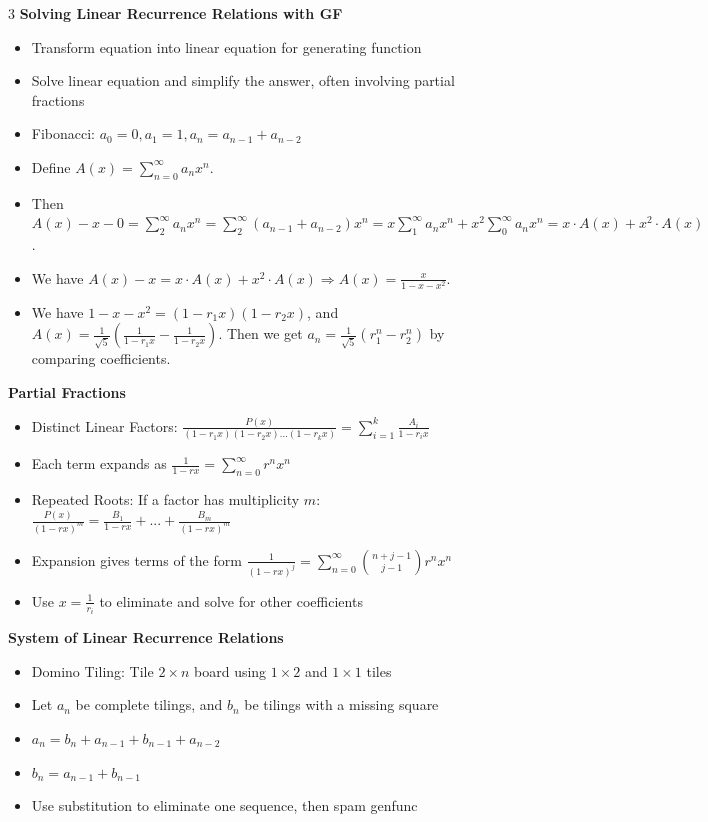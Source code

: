 \documentclass[10pt, landscape]{article}
\begin{document}
\begin{multicols*}{3}
\textbf{Solving Linear Recurrence Relations with GF}
\begin{itemize}
    \item Transform equation into linear equation for generating function
    \item Solve linear equation and simplify the answer, often involving partial fractions
    \item Fibonacci: $a_0=0, a_1=1,a_n=a_{n-1}+a_{n-2}$
    \item Define $A(x)=\sum_{n=0}^\infty a_nx^n$.
    \item Then $A(x)-x-0=\sum_{2}^\infty a_nx^n=\sum_{2}^\infty(a_{n-1}+a_{n-2})x^n=x\sum_{1}^\infty a_nx^n+x^2\sum_{0}^\infty a_nx^n=x\cdot A(x) + x^2 \cdot A(x)$.
    \item We have $A(x)-x=x\cdot A(x)+x^2 \cdot A(x) \Rightarrow A(x)=\frac{x}{1-x-x^2}$.
    \item We have $1-x-x^2=(1-r_1x)(1-r_2x)$, and $A(x)=\frac{1}{\sqrt{5}}(\frac{1}{1-r_1x}-\frac{1}{1-r_2x})$. Then we get $a_n=\frac{1}{\sqrt{5}}(r_1^n-r_2^n)$ by comparing coefficients.
\end{itemize}

\textbf{Partial Fractions}
\begin{itemize}
    \item Distinct Linear Factors: $\frac{P(x)}{(1-r_1x)(1-r_2x)...(1-r_kx)}=\sum_{i=1}^k\frac{A_i}{1-r_ix}$
    \item Each term expands as $\frac{1}{1-rx}=\sum_{n=0}^\infty r^n x^n$
    \item Repeated Roots: If a factor has multiplicity $m$: $\frac{P(x)}{(1-rx)^m}=\frac{B_1}{1-rx}+...+\frac{B_m}{(1-rx)^m}$
    \item Expansion gives terms of the form $\frac{1}{(1-rx)^j}=\sum_{n=0}^\infty{n+j-1 \choose j-1} r^nx^n$
    \item Use $x=\frac{1}{r_i}$ to eliminate and solve for other coefficients
\end{itemize}

\textbf{System of Linear Recurrence Relations}
\begin{itemize}
    \item Domino Tiling: Tile $2 \times n$ board using $1 \times 2$ and $1 \times 1$ tiles
    \item Let $a_n$ be complete tilings, and $b_n$ be tilings with a missing square
    \item $a_n=b_n+a_{n-1}+b_{n-1}+a_{n-2}$
    \item $b_n=a_{n-1}+b_{n-1}$
    \item Use substitution to eliminate one sequence, then spam genfunc
\end{itemize}


\end{multicols*}
\end{document}
